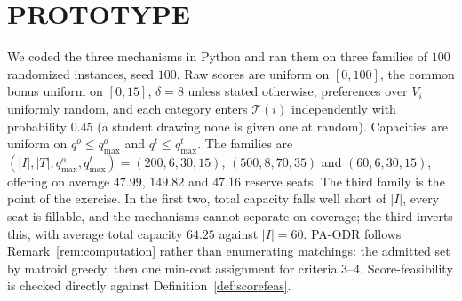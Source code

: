 \documentclass[a4paper,twoside]{article}
\theoremstyle{definition}
\renewcommand{\T}{\mathcal{T}}
\begin{document}

\section{\uppercase{Prototype}}
\label{sec:experiments}

We coded the three mechanisms in Python and ran them on three families of $100$ randomized instances, seed $100$. Raw scores are uniform on $[0,100]$, the common bonus uniform on $[0,15]$, $\delta=8$ unless stated otherwise, preferences over $V_i$ uniformly random, and each category enters $\T(i)$ independently with probability $0.45$ (a student drawing none is given one at random). Capacities are uniform on $q^o\le q^o_{\max}$ and $q^t\le q^t_{\max}$. The families are $(|I|,|T|,q^o_{\max},q^t_{\max})=(200,6,30,15)$, $(500,8,70,35)$ and $(60,6,30,15)$, offering on average $47.99$, $149.82$ and $47.16$ reserve seats. The third family is the point of the exercise. In the first two, total capacity falls well short of $|I|$, every seat is fillable, and the mechanisms cannot separate on coverage; the third inverts this, with average total capacity $64.25$ against $|I|=60$. PA-ODR follows Remark~\ref{rem:computation} rather than enumerating matchings: the admitted set by matroid greedy, then one min-cost assignment for criteria 3--4. Score-feasibility is checked directly against Definition~\ref{def:scorefeas}.
\end{document}
